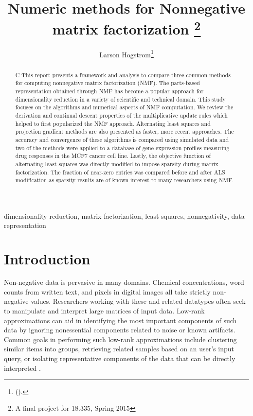 \documentclass[final,leqno,onefignum,onetabnum]{siamltex1213}
\title{Numeric methods for Nonnegative matrix factorization \thanks{A final project for 18.335, Spring 2015}}
\author{Larson Hogstrom\thanks{
(\email{hogstrom@mit.edu}). }}
\begin{document}
\maketitle
{}%

\begin{abstract}
C This report presents a framework and analysis to compare three common methods for computing nonnegative matrix factorization (NMF). The parts-based representation obtained through NMF has become a popular approach for dimensionality reduction in a variety of scientific and technical domain. This study focuses on the algorithms and numerical aspects of NMF computation. We review the derivation and continual descent properties of the multiplicative update rules which helped to first popularized the NMF approach. Alternating least squares and projection gradient methods are also presented as faster, more recent approaches. The accuracy and convergence of these algorithms is compared using simulated data and two of the methods were applied to a database of gene expression profiles measuring drug responses in the MCF7 cancer cell line. Lastly, the objective function of alternating least squares was directly modified to impose sparsity during matrix factorization. The fraction of near-zero entries was compared before and after ALS modification as sparsity results are of known interest to many researchers using NMF. 
\end{abstract}

\begin{keywords} dimensionality reduction, matrix factorization, least squares, nonnegativity, data representation \end{keywords}



\pagestyle{myheadings}
\thispagestyle{plain}

\section{Introduction}

Non-negative data is pervasive in many domains. Chemical concentrations, word counts from written text, and pixels in digital images all take strictly non-negative values. Researchers working with these and related datatypes often seek to manipulate and interpret large matrices of input data. Low-rank approximations can aid in identifying the most important components of such data by ignoring nonessential components related to noise or known artifacts. Common goals in performing such low-rank approximations include clustering similar items into groups, retrieving related samples based on an user's input query, or isolating representative components of the data that can be directly interpreted \cite{Lan}.  
\end{document}
